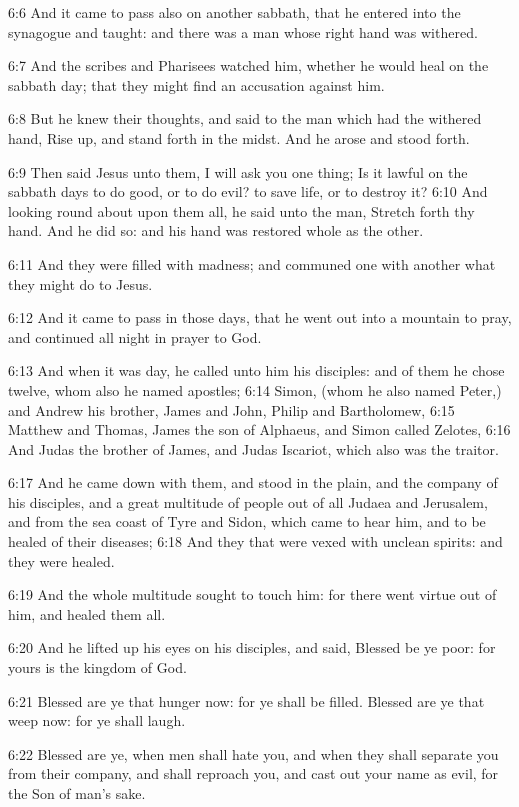 6:6 And it came to pass also on another sabbath, that he entered into the synagogue and taught: and there was a man whose right hand was withered.

6:7 And the scribes and Pharisees watched him, whether he would heal on the sabbath day; that they might find an accusation against him.

6:8 But he knew their thoughts, and said to the man which had the withered hand, Rise up, and stand forth in the midst. And he arose and stood forth.

6:9 Then said Jesus unto them, I will ask you one thing; Is it lawful on the sabbath days to do good, or to do evil? to save life, or to destroy it?  6:10 And looking round about upon them all, he said unto the man, Stretch forth thy hand. And he did so: and his hand was restored whole as the other.

6:11 And they were filled with madness; and communed one with another what they might do to Jesus.

6:12 And it came to pass in those days, that he went out into a mountain to pray, and continued all night in prayer to God.

6:13 And when it was day, he called unto him his disciples: and of them he chose twelve, whom also he named apostles; 6:14 Simon, (whom he also named Peter,) and Andrew his brother, James and John, Philip and Bartholomew, 6:15 Matthew and Thomas, James the son of Alphaeus, and Simon called Zelotes, 6:16 And Judas the brother of James, and Judas Iscariot, which also was the traitor.

6:17 And he came down with them, and stood in the plain, and the company of his disciples, and a great multitude of people out of all Judaea and Jerusalem, and from the sea coast of Tyre and Sidon, which came to hear him, and to be healed of their diseases; 6:18 And they that were vexed with unclean spirits: and they were healed.

6:19 And the whole multitude sought to touch him: for there went virtue out of him, and healed them all.

6:20 And he lifted up his eyes on his disciples, and said, Blessed be ye poor: for yours is the kingdom of God.

6:21 Blessed are ye that hunger now: for ye shall be filled. Blessed are ye that weep now: for ye shall laugh.

6:22 Blessed are ye, when men shall hate you, and when they shall separate you from their company, and shall reproach you, and cast out your name as evil, for the Son of man's sake.

